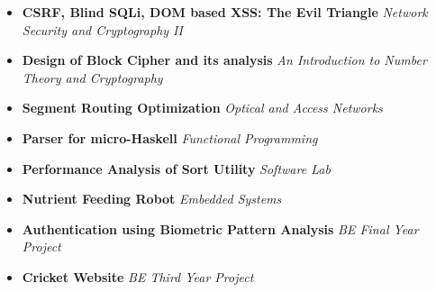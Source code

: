 \begin{itemize}
	\item \textbf{CSRF, Blind SQLi, DOM based XSS: The Evil Triangle} \hfill \emph{Network Security and Cryptography II} \\[-0.6cm]
	\item \textbf{Design of Block Cipher and its analysis} \hfill \emph{An Introduction to Number Theory and Cryptography} \\[-0.6cm]
	\item \textbf{Segment Routing Optimization} \hfill \emph{Optical and Access Networks} \\[-0.6cm]
	\item \textbf{Parser for micro-Haskell} \hfill \emph{Functional Programming} \\[-0.6cm]
	\item \textbf{Performance Analysis of Sort Utility} \hfill \emph{Software Lab} \\[-0.6cm]
	\item \textbf{Nutrient Feeding Robot} \hfill \emph{Embedded Systems} \\[-0.6cm]
	\item \textbf{Authentication using Biometric Pattern Analysis} \hfill \emph{BE Final Year Project} \\[-0.6cm]
	\item \textbf{Cricket Website} \hfill \emph{BE Third Year Project} \\[-0.5cm]
\end{itemize}
